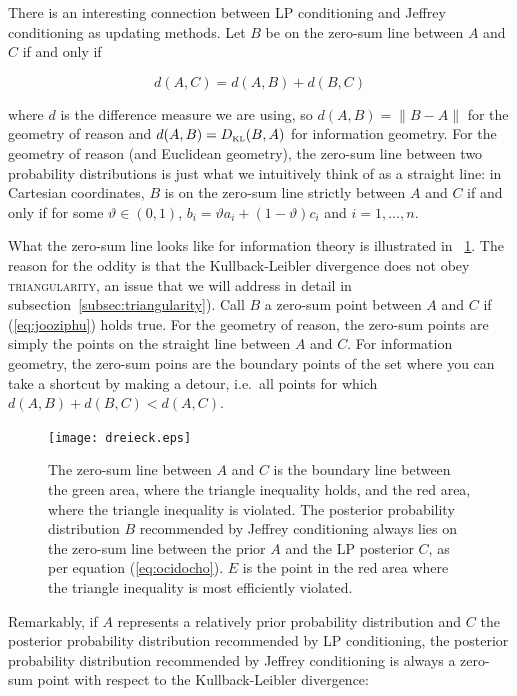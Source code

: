 \documentclass[phd,12pt,oneside]{ubcthesis}
\begin{document}
There is an interesting connection between LP conditioning and Jeffrey
conditioning as updating methods. Let $B$ be on the zero-sum line
between $A$ and $C$ if and only if

\begin{equation}
\label{eq:jooziphu}
d(A,C)=d(A,B)+d(B,C)
\end{equation}

{\noindent}where $d$ is the difference measure we are using, so $d(A,B)=\|B-A\|$
for the geometry of reason and $d(A,B)=D_{\mbox{\tiny KL}}(B,A)$ for
information geometry. For the geometry of reason (and Euclidean
geometry), the zero-sum line between two probability distributions is
just what we intuitively think of as a straight line: in Cartesian
coordinates, $B$ is on the zero-sum line strictly between $A$ and $C$
if and only if for some $\vartheta\in(0,1)$,
$b_{i}=\vartheta{}a_{i}+(1-\vartheta)c_{i}$ and $i=1,\ldots,n$.

What the zero-sum line looks like for information theory is
illustrated in {\igure}~\ref{fig:eugoohue}. The reason for the oddity is
that the Kullback-Leibler divergence does not obey
\textsc{triangularity}, an issue that we will address in detail in
subsection~\ref{subsec:triangularity}). Call $B$ a zero-sum point
between $A$ and $C$ if (\ref{eq:jooziphu}) holds true. For the
geometry of reason, the zero-sum points are simply the points on the
straight line between $A$ and $C$. For information geometry, the
zero-sum poins are the boundary points of the set where you can take a
shortcut by making a detour, i.e.\ all points for which
$d(A,B)+d(B,C)<d(A,C)$.

\begin{figure}[ht!]
    \begin{minipage}[h]{.7\linewidth}
      \texttt{[image: dreieck.eps]}
      \caption{\footnotesize The zero-sum line between $A$ and $C$ is
        the boundary line between the green area, where the triangle
        inequality holds, and the red area, where the triangle
        inequality is violated. The posterior probability distribution
        $B$ recommended by Jeffrey conditioning always lies on the
        zero-sum line between the prior $A$ and the LP posterior $C$,
        as per equation (\ref{eq:ocidocho}). $E$ is the point in the
        red area where the triangle inequality is most efficiently
        violated.}
      \label{fig:eugoohue}
\end{minipage}
\end{figure}

Remarkably, if $A$ represents a relatively prior probability
distribution and $C$ the posterior probability distribution
recommended by LP conditioning, the posterior probability distribution
recommended by Jeffrey conditioning is always a zero-sum point with
respect to the Kullback-Leibler divergence:
\end{document}
